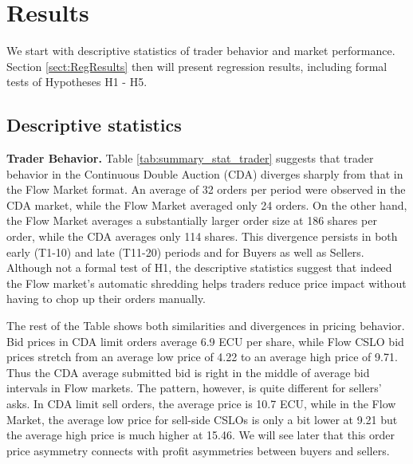 \documentclass[12pt]{article}
\begin{document}

\section{Results} \label{results}


We start with descriptive statistics of trader behavior and market performance. Section \ref{sect:RegResults} then will present regression results, including formal tests of Hypotheses H1 - H5.

\subsection{Descriptive statistics}

\noindent \textbf{Trader Behavior.} 
Table \ref{tab:summary_stat_trader} suggests that trader behavior in the Continuous Double Auction (CDA) 
diverges sharply from that in the Flow Market format. 
An average of 32 orders per period were observed in the CDA market, while the Flow Market averaged only 24 orders. %
On the other hand, the Flow Market averages a substantially larger order size at 186 shares per order, while the CDA averages only 114 shares. This divergence persists in both early (T1-10) and late (T11-20) periods and for Buyers as well as Sellers. Although not a formal test of H1, the descriptive statistics suggest that indeed the Flow market's automatic shredding helps traders reduce price impact without having to chop up their orders manually.  

The rest of the Table shows both similarities and divergences in pricing behavior. 
Bid prices in CDA limit orders average 6.9 ECU per share, while Flow CSLO bid prices stretch from an average low price of 4.22 to an average high price of 9.71. Thus the CDA average submitted bid is right in the middle of average bid intervals in Flow markets. The pattern, however, is quite different for sellers' asks. In CDA limit sell orders, the average price is 10.7 ECU, while in the Flow Market, the average low price for sell-side CSLOs is only a bit lower at 9.21 but the average high price is much higher at 15.46. 
We will see later that this order price asymmetry connects with profit asymmetries between buyers and sellers. 
\end{document}

